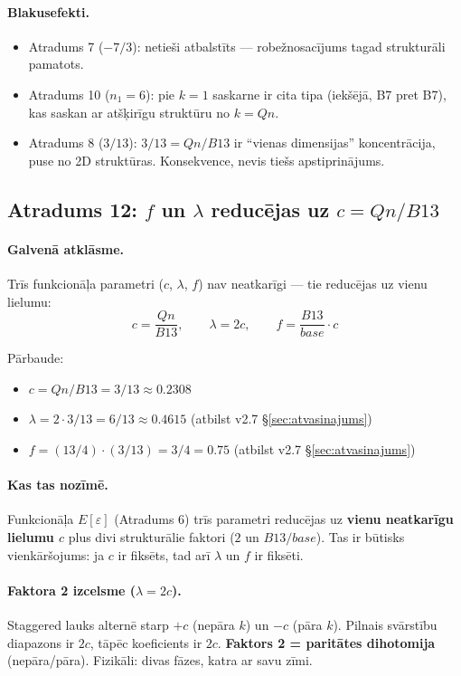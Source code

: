 \documentclass[12pt,a4paper]{article}
\begin{document}
\paragraph{Blakusefekti.}
\begin{itemize}
    \item Atradums 7 ($-7/3$): netieši atbalstīts — robežnosacījums tagad strukturāli pamatots.
    \item Atradums 10 ($n_1=6$): pie $k=1$ saskarne ir cita tipa (iekšējā, B7 pret B7), kas saskan ar atšķirīgu struktūru no $k=Qn$.
    \item Atradums 8 ($3/13$): $3/13 = Qn/B13$ ir ``vienas dimensijas'' koncentrācija, puse no 2D struktūras. Konsekvence, nevis tiešs apstiprinājums.
\end{itemize}

\subsection*{Atradums 12: $f$ un $\lambda$ reducējas uz $c = Qn/B13$}

\paragraph{Galvenā atklāsme.}
Trīs funkcionāļa parametri ($c$, $\lambda$, $f$) nav neatkarīgi — tie reducējas uz vienu lielumu:
\[
\boxed{\; c = \frac{Qn}{B13}, \qquad \lambda = 2c, \qquad f = \frac{B13}{base} \cdot c \;}
\]

Pārbaude:
\begin{itemize}
    \item $c = Qn/B13 = 3/13 \approx 0.2308$
    \item $\lambda = 2 \cdot 3/13 = 6/13 \approx 0.4615$ (atbilst v2.7 \S\ref{sec:atvasinajums})
    \item $f = (13/4) \cdot (3/13) = 3/4 = 0.75$ (atbilst v2.7 \S\ref{sec:atvasinajums})
\end{itemize}

\paragraph{Kas tas nozīmē.}
Funkcionāļa $E[\varepsilon]$ (Atradums 6) trīs parametri reducējas uz \textbf{vienu neatkarīgu lielumu $c$} plus divi strukturālie faktori ($2$ un $B13/base$). Tas ir būtisks vienkāršojums: ja $c$ ir fiksēts, tad arī $\lambda$ un $f$ ir fiksēti.

\paragraph{Faktora 2 izcelsme ($\lambda = 2c$).}
Staggered lauks alternē starp $+c$ (nepāra $k$) un $-c$ (pāra $k$). Pilnais svārstību diapazons ir $2c$, tāpēc koeficients ir $2c$. \textbf{Faktors 2 = paritātes dihotomija} (nepāra/pāra). Fizikāli: divas fāzes, katra ar savu zīmi.
\end{document}
